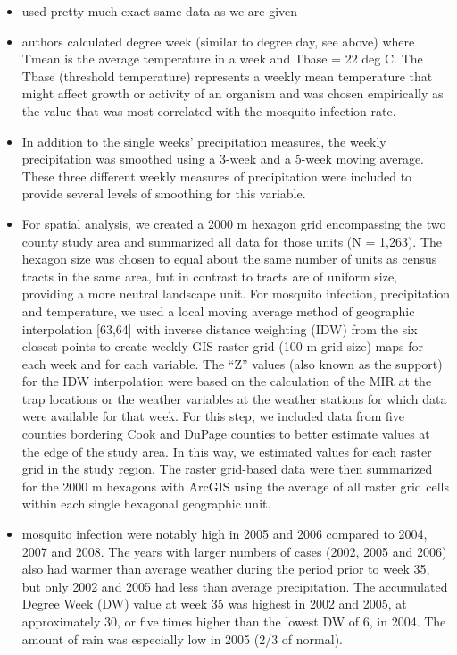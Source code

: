 \documentclass[a4, 12pt]{article}
\begin{document}
\begin{itemize}
\item used pretty much exact same data as we are given
\item authors calculated degree week (similar to degree day, see above) where Tmean is the average temperature in a week and Tbase = 22 deg C. The Tbase (threshold temperature) represents a weekly mean temperature that might affect growth or activity of an organism and was chosen empirically as the value that was most correlated with the mosquito infection rate.
\item In addition to the single weeks’ precipitation measures, the weekly precipitation was smoothed using a 3-week and a 5-week moving average. These three different weekly measures of precipitation were included to provide several levels of smoothing for this variable.
\item For spatial analysis, we created a 2000 m hexagon grid encompassing the two county study area and summarized all data for those units (N = 1,263). The hexagon size was chosen to equal about the same number of units as census tracts in the same area, but in contrast to tracts are of uniform size, providing a more neutral landscape unit. For mosquito infection, precipitation and temperature, we used a local moving average method of geographic interpolation [63,64] with inverse distance weighting (IDW) from the six closest points to create weekly GIS raster grid (100 m grid size) maps for each week and for each variable.  The “Z” values (also
known as the support) for the IDW interpolation were based on the calculation of the MIR at the trap locations or the weather variables at the weather stations for which data were available for that week. For this step, we included data from five counties bordering Cook and DuPage counties to better estimate values at the edge of the study area. In this way, we estimated values for each raster grid in the study region. The raster grid-based data were then summarized for the 2000 m hexagons with ArcGIS using the average of all raster grid cells within each single hexagonal geographic unit.
\item  mosquito infection were notably high in 2005 and 2006 compared to 2004, 2007 and 2008. The years with larger numbers of cases (2002, 2005 and 2006) also had warmer than average weather during the period prior to week 35, but only 2002 and 2005 had less than average precipitation. The accumulated Degree Week (DW) value at week 35 was highest in 2002 and 2005, at approximately 30, or five times higher than the lowest DW of 6, in 2004. The amount of rain was especially low in 2005 (2/3 of normal).

\end{itemize}
\end{document}
